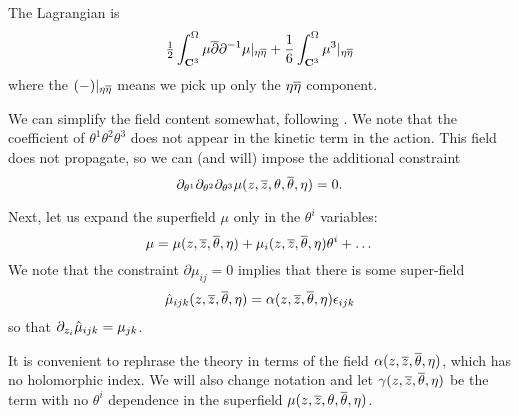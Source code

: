 \documentclass[../main.tex]{subfiles}
\begin{document}
The Lagrangian is
	\begin{equation} 
		\tfrac{1}{2} \int_{\mathbf{C}^{3}}^\Omega  \mu \overline{\partial} \partial^{-1} \mu |_{\eta \overline{\eta}} + \frac{1}{6} \int_{\mathbf{C}^{3}}^\Omega \mu^3 |_{\eta \overline{\eta}}  
	\end{equation}
where the $(-)|_{\eta \overline{\eta}}$ means we pick up only the $\eta \overline{\eta}$ component.

We can simplify the field content somewhat, following \cite{CostelloGaiotto}.  
We note that the coefficient of $\theta^1 \theta^2 \theta^3$ does not appear in the kinetic term in the action.  
This field does not propagate, so we can (and will) impose the additional constraint
\begin{equation}\label{eq:nonprop} 
	\partial_{\theta^1} \partial_{\theta^2} \partial_{\theta^3} \mu (z,{\overline{z}},\theta,\overline{\theta},\eta) = 0. 
\end{equation}

Next, let us expand the superfield $\mu$ only in the $\theta^i$ variables:
\begin{equation} 
	\mu = \mu(z,{\overline{z}},\overline{\theta},\eta) + \mu_{i}(z,{\overline{z}},\overline{\theta},\eta) \theta^i + \dots 
\end{equation}
We note that the constraint $\partial \mu_{ij} = 0$ implies that there is some super-field
\begin{equation} 
	\Hat{\mu}_{ijk}(z,{\overline{z}},\overline{\theta},\eta) = 	\alpha(z,{\overline{z}},\overline{\theta},\eta) {\epsilon}_{ijk}   
\end{equation}
so that $\partial_{z_i} \Hat{\mu}_{ijk} = \mu_{jk}$.

It is convenient to rephrase the theory in terms of the field $\alpha(z,{\overline{z}},\overline{\theta},\eta)$, which has no holomorphic index. 
We will also change notation and let $\gamma(z,{\overline{z}},\overline{\theta},\eta)$ be the term with no $\theta^i$ dependence in the superfield $\mu(z,{\overline{z}},\theta,\overline{\theta},\eta)$.  
\end{document}
